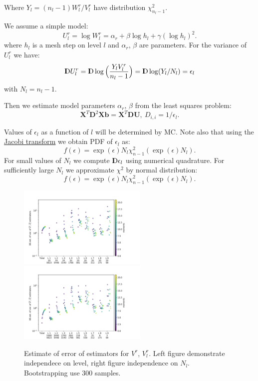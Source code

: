 \documentclass{article}
\def\vc#1{\mathbf{\boldsymbol{#1}}}     %
\def\tn#1{\boldsymbol{#1}}
\def \D{{{\rm I\kern-.3em D}}}
\begin{document}
Where $Y_l = (n_l -1)W_l^r/V_l^r$ have distribution $\chi^2_{n_l -1}$.

We assume a simple model:
$$
  U_l^r = \log W_l^r =  \alpha_r + \beta \log h_l + \gamma (\log h_l)^2.
$$
where $h_l$ is a mesh step on level $l$ and $\alpha_r$, $\beta$ are parameters. 
For the variance of $U_l^r$ we have:
$$
  \D U_l^r = \D \log \Big( \frac{Y_l V_l^r}{n_l - 1} \Big) = \D \log (Y_l/N_l) = \epsilon_l
$$
with $N_l = n_l - 1$.

Then we estimate model parameters $\alpha_r$, $\beta$ from the least squares problem:
$$
    \tn{X}^T \tn{D}^2 \tn{X} \vc{b} = \tn{X}^T \tn{D} \vc{U},
    \ D_{i,i} = 1/\epsilon_{l}.
$$

Values of $\epsilon_l$ as a function of $l$ will be determined by MC. Note also that using the \href{https://en.wikipedia.org/wiki/Probability_density_function#Dependent_variables_and_change_of_variables}{Jacobi transform} we obtain PDF of $\epsilon_l$ as:
$$
    f(\epsilon) = \exp(\epsilon)N_l\chi^2_{n-1}(\exp(\epsilon)N_l).
$$
For small values of $N_l$ we compute $\D \epsilon_l$ using numerical quadrature. For sufficiently large $N_l$ we approximate $\chi^2$ by normal distribution:
$$
    f(\epsilon) = \exp(\epsilon)N_l\chi^2_{n-1}(\exp(\epsilon)N_l).
$$

\begin{figure}
 \includegraphics[width=0.55\textwidth]{bs_var_var_20.pdf}
 \hspace{-0.1\textwidth}
 \includegraphics[width=0.55\textwidth]{bs_var_var_Nl.pdf}
 \caption{Estimate of error of estimators for $V^r$, $V_l^r$. Left figure demonstrate independece on level, right figure independence on $N_l$. Bootstrapping use 300 samples.}
 \label{fig:bs_var_var}
\end{figure}
\end{document}
